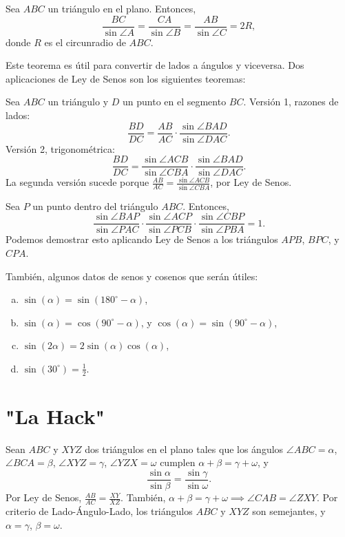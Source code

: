 \documentclass[11pt]{scrartcl}
\begin{document}
    \begin{theorem}
        Sea $ABC$ un triángulo en el plano. Entonces,
        \[\frac{BC}{\sin\angle A}=\frac{CA}{\sin\angle B}=\frac{AB}{\sin\angle C}=2R,\]
        donde $R$ es el circunradio de $ABC$.
    \end{theorem}
    Este teorema es útil para convertir de lados a ángulos y viceversa. Dos aplicaciones de Ley de Senos son los siguientes teoremas:
    \begin{theorem}
        Sea $ABC$ un triángulo y $D$ un punto en el segmento $BC$. Versión 1, razones de lados:
        \[\frac{BD}{DC}=\frac{AB}{AC}\cdot\frac{\sin\angle BAD}{\sin\angle DAC}.\] 
        Versión 2, trigonométrica:
        \[\frac{BD}{DC}=\frac{\sin\angle ACB}{\sin\angle CBA}\cdot\frac{\sin\angle BAD}{\sin\angle DAC}.\] La segunda versión sucede porque $\frac{AB}{AC}=\frac{\sin\angle ACB}{\sin\angle CBA}$, por Ley de Senos.
    \end{theorem}

    \begin{theorem}
        Sea $P$ un punto dentro del triángulo $ABC$. Entonces,
        \[\frac{\sin\angle BAP}{\sin\angle PAC}\cdot\frac{\sin\angle ACP}{\sin\angle PCB}\cdot\frac{\sin\angle CBP}{\sin\angle PBA}=1.\]
        Podemos demostrar esto aplicando Ley de Senos a los triángulos $APB$, $BPC$, y $CPA$.
    \end{theorem} 

    También, algunos datos de senos y cosenos que serán útiles:
    \begin{enumerate}[a)]
        \item $\sin(\alpha)=\sin(180^{\circ}-\alpha)$,
        \item $\sin(\alpha)=\cos(90^{\circ}-\alpha)$, y $\cos(\alpha)=\sin(90^{\circ}-\alpha)$, 
        \item $\sin(2\alpha)=2\sin(\alpha)\cos(\alpha)$,
        \item $\sin(30^{\circ})=\frac 12$.
    \end{enumerate}

\section{"La Hack"}

    Sean $ABC$ y $XYZ$ dos triángulos en el plano tales que los ángulos $\angle ABC = \alpha$, $\angle BCA = \beta$, $\angle XYZ = \gamma$, $\angle YZX = \omega$ cumplen $\alpha + \beta = \gamma + \omega$, y
    \[\frac{\sin\alpha}{\sin\beta}=\frac{\sin\gamma}{\sin\omega}.\]
    Por Ley de Senos, $\frac{AB}{AC}=\frac{XY}{XZ}$. También, $\alpha + \beta = \gamma + \omega\implies\angle CAB = \angle ZXY$. Por criterio de Lado-Ángulo-Lado, los triángulos $ABC$ y $XYZ$ son semejantes, y $\alpha = \gamma$, $\beta = \omega$.
\end{document}
